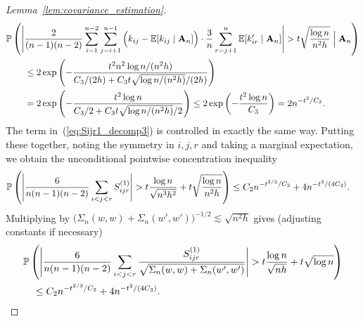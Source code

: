 \begin{proof}[Lemma~\ref{lem:covariance_estimation}]
\begin{align*}
    &\P\left(
      \Bigg|
      \frac{2}{(n-1)(n-2)}
      \sum_{i=1}^{n-2}
      \sum_{j=i+1}^{n-1}
      \Big(
      k_{ij}
      - \E[k_{ij} \mid \bA_n]
      \Big)
      \cdot \frac{3}{n}
      \sum_{r=j+1}^n
      \E[k_{ir}' \mid \bA_n]
      \Bigg|
      > t
      \sqrt{\frac{\log n}{n^2h}}
      \Bigm\vert \bA_n
    \right) \\
    &\qquad\leq
    2 \exp \left( -
      \frac{t^2 n^2 \log n / (n^2h)}
      {C_3/(2h) + C_3 t \sqrt{\log n / (n^2h)} / (2h)}
    \right) \\
    &\qquad=
    2 \exp \left( -
      \frac{t^2 \log n}
      {C_3/2 + C_3 t \sqrt{\log n / (n^2h)} / 2}
    \right)
    \leq
    2 \exp \left( -
      \frac{t^2 \log n}{C_3}
    \right)
    =
    2 n^{-t^2 / C_3}.
  \end{align*}
  The term in~(\ref{eq:Sijr1_decomp3})
  is controlled in exactly the same way.
  Putting these together, noting the symmetry in $i,j,r$
  and taking a marginal expectation,
  we obtain the unconditional pointwise concentration inequality
  \begin{align*}
    \P\left(
      \Bigg|
      \frac{6}{n(n-1)(n-2)}
      \sum_{i<j<r}
      S_{ijr}^{(1)}
      \Bigg|
      > t
      \frac{\log n}{\sqrt{n^3h^2}}
      + t \sqrt{\frac{\log n}{n^2h}}
    \right)
    &\leq
    C_2 n^{-t^{2/3} / C_2}
    + 4 n^{-t^2 / (4C_3)}.
  \end{align*}
  Multiplying by
  $\big(\Sigma_n(w,w) + \Sigma_n(w',w')\big)^{-1/2} \lesssim \sqrt{n^2h}$
  gives (adjusting constants if necessary)
  \begin{align*}
    &\P\left(
      \Bigg|
      \frac{6}{n(n-1)(n-2)}
      \sum_{i<j<r}
      \frac{S_{ijr}^{(1)}}
      {\sqrt{\Sigma_n(w,w) + \Sigma_n(w',w')}}
      \Bigg|
      > t \frac{\log n}{\sqrt{nh}}
      + t \sqrt{\log n}
    \right) \\
    &\quad\leq
    C_2 n^{-t^{2/3} / C_2}
    + 4 n^{-t^2 / (4C_3)}.
  \end{align*}



\end{proof}
